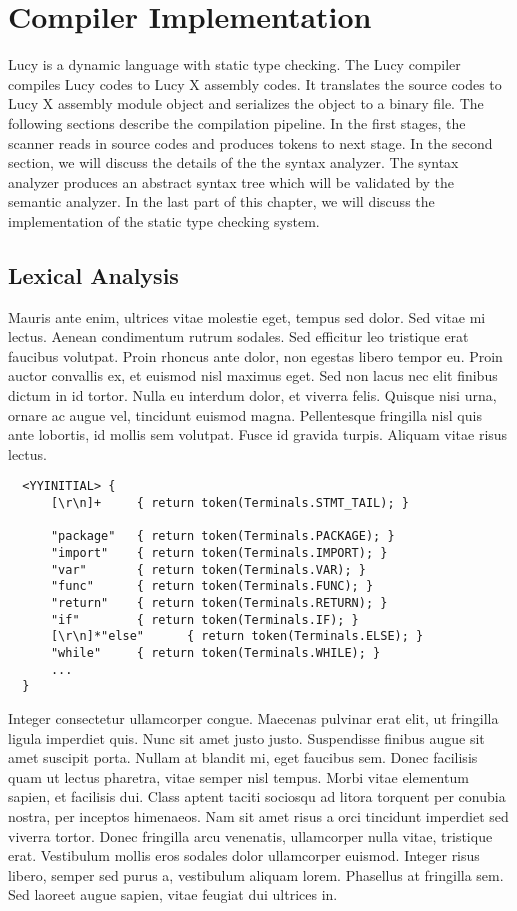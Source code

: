 \chapter{Compiler Implementation}
Lucy is a dynamic language with static type checking. The Lucy compiler compiles Lucy codes to Lucy X assembly codes. It translates the source codes to Lucy X assembly module object and serializes the object to a binary file. The following sections describe the compilation pipeline. In the first stages, the scanner reads in source codes and produces tokens to next stage. In the second section, we will discuss the details of the the syntax analyzer. The syntax analyzer produces an abstract syntax tree which will be validated by the semantic analyzer. In the last part of this chapter, we will discuss the implementation of the static type checking system.


\section{Lexical Analysis}
Mauris ante enim, ultrices vitae molestie eget, tempus sed dolor. Sed vitae mi lectus. Aenean condimentum rutrum sodales. Sed efficitur leo tristique erat faucibus volutpat. Proin rhoncus ante dolor, non egestas libero tempor eu. Proin auctor convallis ex, et euismod nisl maximus eget. Sed non lacus nec elit finibus dictum in id tortor. Nulla eu interdum dolor, et viverra felis. Quisque nisi urna, ornare ac augue vel, tincidunt euismod magna. Pellentesque fringilla nisl quis ante lobortis, id mollis sem volutpat. Fusce id gravida turpis. Aliquam vitae risus lectus.
\begin{lstlisting}
  <YYINITIAL> {
      [\r\n]+     { return token(Terminals.STMT_TAIL); }

      "package"   { return token(Terminals.PACKAGE); }
      "import"    { return token(Terminals.IMPORT); }
      "var"       { return token(Terminals.VAR); }
      "func"      { return token(Terminals.FUNC); }
      "return"    { return token(Terminals.RETURN); }
      "if"        { return token(Terminals.IF); }
      [\r\n]*"else"      { return token(Terminals.ELSE); }
      "while"     { return token(Terminals.WHILE); }
      ...
  }
\end{lstlisting}
Integer consectetur ullamcorper congue. Maecenas pulvinar erat elit, ut fringilla ligula imperdiet quis. Nunc sit amet justo justo. Suspendisse finibus augue sit amet suscipit porta. Nullam at blandit mi, eget faucibus sem. Donec facilisis quam ut lectus pharetra, vitae semper nisl tempus. Morbi vitae elementum sapien, et facilisis dui. Class aptent taciti sociosqu ad litora torquent per conubia nostra, per inceptos himenaeos. Nam sit amet risus a orci tincidunt imperdiet sed viverra tortor. Donec fringilla arcu venenatis, ullamcorper nulla vitae, tristique erat. Vestibulum mollis eros sodales dolor ullamcorper euismod. Integer risus libero, semper sed purus a, vestibulum aliquam lorem. Phasellus at fringilla sem. Sed laoreet augue sapien, vitae feugiat dui ultrices in.


